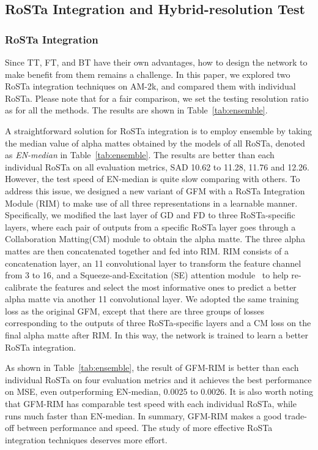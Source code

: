 \documentclass[twocolumn]{svjour3}
\begin{document}
\subsection{RoSTa Integration and Hybrid-resolution Test}

\subsubsection{RoSTa Integration}

Since TT, FT, and BT have their own advantages, how to design the network to make benefit from them remains a challenge. In this paper, we explored two RoSTa integration techniques on AM-2k, and compared them with individual RoSTa. Please note that for a fair comparison, we set the testing resolution ratio as  for all the methods. The results are shown in Table~\ref{tab:ensemble}.

A straightforward solution for RoSTa integration is to employ ensemble by taking the median value of alpha mattes obtained by the models of all RoSTa, denoted as \textit{EN-median} in Table~\ref{tab:ensemble}. The results are better than each individual RoSTa on all evaluation metrics,  SAD 10.62 to 11.28, 11.76 and 12.26. However, the test speed of EN-median is quite slow comparing with others. To address this issue, we designed a new variant of GFM with a RoSTa Integration Module (RIM) to make use of all three representations in a learnable manner. Specifically, we modified the last layer of GD and FD to three RoSTa-specific layers, where each pair of outputs from a specific RoSTa layer goes through a Collaboration Matting(CM) module to obtain the alpha matte. The three alpha mattes are then concatenated together and fed into RIM. RIM consists of a concatenation layer, an 11 convolutional layer to transform the feature channel from 3 to 16, and a Squeeze-and-Excitation (SE) attention module~\citep{hu2018squeeze} to help re-calibrate the features and select the most informative ones to predict a better alpha matte via another 11 convolutional layer. We adopted the same training loss as the original GFM, except that there are three groups of losses corresponding to the outputs of three RoSTa-specific layers and a CM loss on the final alpha matte after RIM. In this way, the network is trained to learn a better RoSTa integration.

As shown in Table~\ref{tab:ensemble}, the result of GFM-RIM is better than each individual RoSTa on four evaluation metrics and it achieves the best performance on MSE, even outperforming EN-median,  0.0025 to 0.0026. It is also worth noting that GFM-RIM has comparable test speed with each individual RoSTa, while runs much faster than EN-median. In summary, GFM-RIM makes a good trade-off between performance and speed. The study of more effective RoSTa integration techniques deserves more effort.
\end{document}
